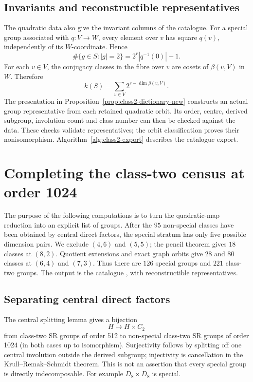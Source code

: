 \documentclass[11pt,a4paper]{amsart}
\theoremstyle{definition}
\theoremstyle{remark}
\numberwithin{equation}{section}
\begin{document}
\subsection{Invariants and reconstructible representatives}\label{sec:class2-invariants}
The quadratic data also give the invariant columns of the catalogue.
For a special group associated with $q:V\to W$, every element over
$v$ has square $q(v)$, independently of its $W$-coordinate. Hence
\begin{equation}\label{eq:quadratic-involutions}
 \#\{g\in S:|g|=2\}=2^r|q^{-1}(0)|-1.
\end{equation}
For each $v\in V$, the conjugacy classes in the fibre over $v$ are
cosets of $\beta(v,V)$ in $W$. Therefore
\begin{equation}\label{eq:quadratic-classes}
 k(S)=\sum_{v\in V}2^{r-\dim\beta(v,V)}.
\end{equation}
The presentation in Proposition~\ref{prop:class2-dictionary-new}
constructs an actual group representative from each retained quadratic
orbit. Its order, centre, derived subgroup, involution count and class
number can then be checked against the data. These checks validate
representatives; the orbit classification proves their nonisomorphism.
Algorithm~\ref{alg:class2-export} describes the catalogue export.

\section{Completing the class-two census at order 1024}\label{sec:remaining}
The purpose of the following computations is to turn the quadratic-map
reduction into an explicit list of groups. After the $95$ non-special
classes have been obtained by central direct factors, the special
stratum has only five possible dimension pairs. We exclude $(4,6)$
and $(5,5)$; the pencil theorem gives $18$ classes at $(8,2)$.
Quotient extensions and exact graph orbits give $28$ and $80$ classes
at $(6,4)$ and $(7,3)$. Thus there are $126$ special groups and $221$
class-two groups. The output is the catalogue
, with reconstructible representatives.

\subsection{Separating central direct factors}
The central splitting lemma gives a bijection
\[
 H\longmapsto H\times C_2
\]
from class-two SR groups of order 512 to non-special class-two SR
groups of order 1024 (in both cases up to isomorphism).
Surjectivity follows by splitting off one central involution outside
the derived subgroup; injectivity is cancellation in the
Krull--Remak--Schmidt theorem. This is not an assertion that every special
group is directly indecomposable. For example $D_8\times D_8$ is special.
\end{document}

